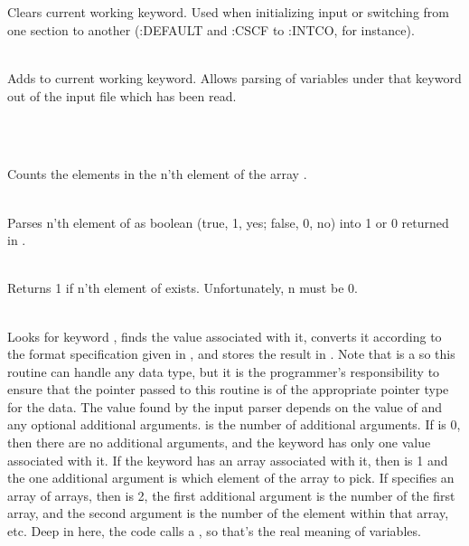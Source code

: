 \begin{center} \\ \end{center}

 \\
Clears current working keyword.  Used when initializing input or switching
from one section to another (:DEFAULT and :CSCF to :INTCO, for instance).

 \\
Adds  to current working keyword.  Allows parsing of 
variables under that keyword out of the input file which has been read.

\begin{center}  \\ \end{center}

 \\
Counts the elements in the n'th element of the array .

 \\
Parses n'th element of  as boolean (true, 1, yes; false, 0, no)
into 1 or 0 returned in .

 \\
Returns 1 if n'th element of  exists.  Unfortunately, n must be 0.

 \\
Looks for keyword , finds the value associated with it,
converts it according to the format specification given in
, and stores the result in .  Note that
 is a  so this routine can handle any data
type, but it is the programmer's responsibility to ensure that the
pointer passed to this routine is of the appropriate pointer type for
the data.  The value found by the input parser depends on the value of
 and any optional additional arguments.   is the
number of additional arguments.  If  is 0, then there are no
additional arguments, and the keyword has only one value associated
with it.  If the keyword has an array associated with it, then
 is 1 and the one additional argument is which element of the
array to pick.  If  specifies an array of arrays, then
 is 2, the first additional argument is the number of the
first array, and the second argument is the number of the element
within that array, etc.  Deep in here, the code calls a
, so that's the real meaning of
variables.

